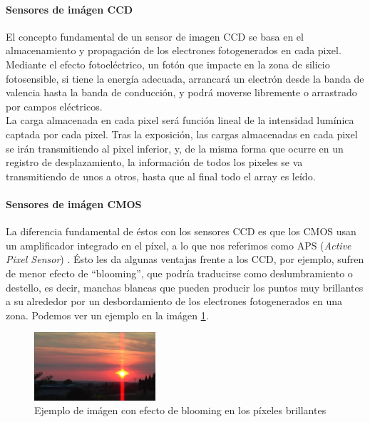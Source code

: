 \paragraph{Sensores de imágen CCD}
El concepto fundamental de un sensor de imagen CCD se basa en el almacenamiento
y propagación de los electrones fotogenerados en cada pixel. Mediante el efecto
fotoeléctrico, un fotón que impacte en la zona de silicio fotosensible, si tiene
la energía adecuada, arrancará un electrón desde la banda de valencia hasta la
banda de conducción, y podrá moverse libremente o arrastrado por campos eléctricos.\\

La carga almacenada en cada pixel será función lineal de la intensidad lumínica
captada por cada pixel. Tras la exposición, las cargas almacenadas en cada pixel
se irán transmitiendo al pixel inferior, y, de la misma forma que ocurre en un
registro de desplazamiento, la información de todos los pixeles se va transmitiendo
de unos a otros, hasta que al final todo el array es leído.\cite{Nakamura2005}\\

\paragraph{Sensores de imágen CMOS}
La diferencia fundamental de éstos con los sensores CCD es que los CMOS usan un
amplificador integrado en el píxel, a lo que nos referimos como APS (\textit{Active Pixel Sensor})
\cite{Fossum1993}. Ésto les da algunas ventajas
frente a los CCD, por ejemplo, sufren de menor efecto de ``blooming'', que podría
traducirse como deslumbramiento o destello, es decir, manchas blancas que pueden
producir los puntos muy brillantes a su alrededor por un desbordamiento de los
electrones fotogenerados en una zona. Podemos ver un ejemplo en la
imágen \ref{fig:blooming}\cite{Commons:Kriplozoik}.\\

\begin{figure}[h]
	\centering
	\includegraphics[width=0.4\textwidth]{img/blooming.jpg}
	\caption{Ejemplo de imágen con efecto de blooming en los píxeles brillantes}
	\label{fig:blooming}
\end{figure}

